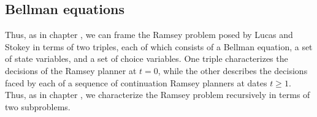 \subsection{Bellman equations}
Thus, as in chapter , we can frame the Ramsey problem posed by Lucas and Stokey in terms of two triples, each of which consists of a Bellman equation, a set of state variables, and a set of choice variables. One triple characterizes the decisions of the Ramsey planner at  $t=0$, while the other  describes the decisions faced by each of a sequence of continuation Ramsey planners at dates $t \geq 1$.
Thus, as in chapter , we characterize the Ramsey problem recursively in terms of two subproblems.
%
%
%
%
